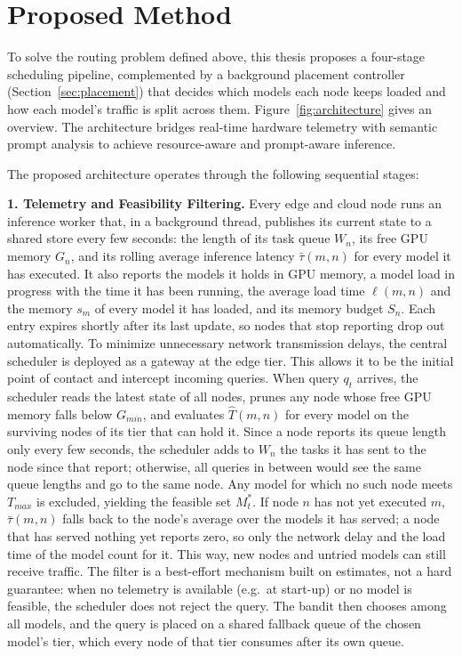 \section{Proposed Method}
\label{sec:method}

To solve the routing problem defined above, this thesis proposes a four-stage scheduling pipeline, complemented by a background placement controller (Section~\ref{sec:placement}) that decides which models each node keeps loaded and how each model's traffic is split across them.
Figure~\ref{fig:architecture} gives an overview.
The architecture bridges real-time hardware telemetry with semantic prompt analysis to achieve resource-aware and prompt-aware inference.

\noindent
The proposed architecture operates through the following sequential stages:

\textbf{1. Telemetry and Feasibility Filtering.}
Every edge and cloud node runs an inference worker that, in a background thread, publishes its current state to a shared store every few seconds: the length of its task queue $W_n$, its free GPU memory $G_n$, and its rolling average inference latency $\bar{\tau}(m, n)$ for every model it has executed.
It also reports the models it holds in GPU memory, a model load in progress with the time it has been running, the average load time $\ell(m, n)$ and the memory $s_m$ of every model it has loaded, and its memory budget $S_n$.
Each entry expires shortly after its last update, so nodes that stop reporting drop out automatically.
To minimize unnecessary network transmission delays, the central scheduler is deployed as a gateway at the edge tier. This allows it to be the initial point of contact and intercept incoming queries.
When query $q_t$ arrives, the scheduler reads the latest state of all nodes, prunes any node whose free GPU memory falls below $G_{min}$, and evaluates $\hat{T}(m, n)$ for every model on the surviving nodes of its tier that can hold it.
Since a node reports its queue length only every few seconds, the scheduler adds to $W_n$ the tasks it has sent to the node since that report; otherwise, all queries in between would see the same queue lengths and go to the same node.
Any model for which no such node meets $T_{max}$ is excluded, yielding the feasible set $M_t^*$.
If node $n$ has not yet executed $m$, $\bar{\tau}(m, n)$ falls back to the node's average over the models it has served; a node that has served nothing yet reports zero, so only the network delay and the load time of the model count for it.
This way, new nodes and untried models can still receive traffic. The filter is a best-effort mechanism built on estimates, not a hard guarantee: when no telemetry is available (e.g.\ at start-up) or no model is feasible, the scheduler does not reject the query.
The bandit then chooses among all models, and the query is placed on a shared fallback queue of the chosen model's tier, which every node of that tier consumes after its own queue.

